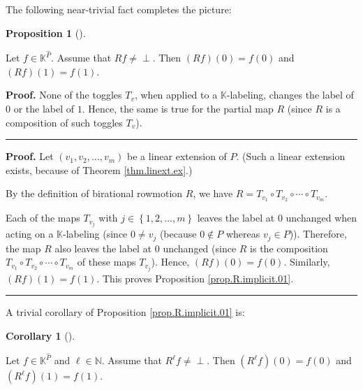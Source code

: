 \documentclass[numbers=enddot,12pt,final,onecolumn,notitlepage]{scrartcl}%
\theoremstyle{definition}
\newtheorem{prop}[theo]{Proposition}
\newenvironment{proposition}[1][]
{\begin{prop}[#1]\begin{leftbar}}
{\end{leftbar}\end{prop}}
\newtheorem{coro}[theo]{Corollary}
\newenvironment{corollary}[1][]
{\begin{coro}[#1]\begin{leftbar}}
{\end{leftbar}\end{coro}}
\newenvironment{verlong}{}{}
\newenvironment{vershort}{}{}
\newcommand{\undf}{\operatorname*{\bot}}
\newenvironment{proof}[1][Proof]{\noindent\textbf{#1.} }{\ \rule{0.5em}{0.5em}}
\begin{document}
The following near-trivial fact completes the picture:

\begin{proposition}
\label{prop.R.implicit.01}Let $f\in\mathbb{K}^{\widehat{P}}$. Assume that
$Rf\neq\undf$. Then $\left(  Rf\right)  \left(  0\right)  =f\left(  0\right)
$ and $\left(  Rf\right)  \left(  1\right)  =f\left(  1\right)  $.
\end{proposition}

\begin{vershort}
\begin{proof}
None of the toggles $T_{v}$, when applied to a $\mathbb{K}$-labeling, changes
the label of $0$ or the label of $1$. Hence, the same is true for the partial
map $R$ (since $R$ is a composition of such toggles $T_{v}$).
\end{proof}
\end{vershort}

\begin{verlong}
\begin{proof}
Let $\left(  v_{1},v_{2},\ldots,v_{m}\right)  $ be a linear extension of $P$.
(Such a linear extension exists, because of Theorem \ref{thm.linext.ex}.)

By the definition of birational rowmotion $R$, we have $R=T_{v_{1}}\circ
T_{v_{2}}\circ\cdots\circ T_{v_{m}}$.

Each of the maps $T_{v_{j}}$ with $j\in\left\{  1,2,\ldots,m\right\}  $ leaves
the label at $0$ unchanged when acting on a $\mathbb{K}$-labeling (since
$0\neq v_{j}$ (because $0\notin P$ whereas $v_{j}\in P$)). Therefore, the map
$R$ also leaves the label at $0$ unchanged (since $R$ is the composition
$T_{v_{1}}\circ T_{v_{2}}\circ\cdots\circ T_{v_{m}}$ of these maps $T_{v_{j}}%
$). Hence, $\left(  Rf\right)  \left(  0\right)  =f\left(  0\right)  $.
Similarly, $\left(  Rf\right)  \left(  1\right)  =f\left(  1\right)  $. This
proves Proposition \ref{prop.R.implicit.01}.
\end{proof}
\end{verlong}

A trivial corollary of Proposition \ref{prop.R.implicit.01} is:

\begin{corollary}
\label{cor.R.implicit.01}Let $f\in\mathbb{K}^{\widehat{P}}$ and $\ell
\in\mathbb{N}$. Assume that $R^{\ell}f\neq\undf$. Then $\left(  R^{\ell
}f\right)  \left(  0\right)  =f\left(  0\right)  $ and $\left(  R^{\ell
}f\right)  \left(  1\right)  =f\left(  1\right)  $.
\end{corollary}
\end{document}
